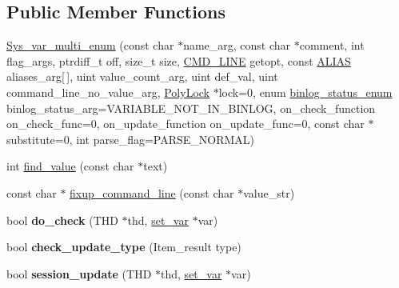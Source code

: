 \subsection*{Public Member Functions}
\begin{DoxyCompactItemize}
\item 
\mbox{\hyperlink{classSys__var__multi__enum_ac0836078707c904cf4bb8b08ab5fe1e8}{Sys\+\_\+var\+\_\+multi\+\_\+enum}} (const char $\ast$name\+\_\+arg, const char $\ast$comment, int flag\+\_\+args, ptrdiff\+\_\+t off, size\+\_\+t size, \mbox{\hyperlink{structCMD__LINE}{C\+M\+D\+\_\+\+L\+I\+NE}} getopt, const \mbox{\hyperlink{structSys__var__multi__enum_1_1ALIAS}{A\+L\+I\+AS}} aliases\+\_\+arg\mbox{[}$\,$\mbox{]}, uint value\+\_\+count\+\_\+arg, uint def\+\_\+val, uint command\+\_\+line\+\_\+no\+\_\+value\+\_\+arg, \mbox{\hyperlink{classPolyLock}{Poly\+Lock}} $\ast$lock=0, enum \mbox{\hyperlink{classsys__var_a664520ec82191888717c86085bfa83ce}{binlog\+\_\+status\+\_\+enum}} binlog\+\_\+status\+\_\+arg=V\+A\+R\+I\+A\+B\+L\+E\+\_\+\+N\+O\+T\+\_\+\+I\+N\+\_\+\+B\+I\+N\+L\+OG, on\+\_\+check\+\_\+function on\+\_\+check\+\_\+func=0, on\+\_\+update\+\_\+function on\+\_\+update\+\_\+func=0, const char $\ast$substitute=0, int parse\+\_\+flag=P\+A\+R\+S\+E\+\_\+\+N\+O\+R\+M\+AL)
\item 
int \mbox{\hyperlink{classSys__var__multi__enum_a96baf73f0d0ef4d45e1961218771809e}{find\+\_\+value}} (const char $\ast$text)
\item 
const char $\ast$ \mbox{\hyperlink{classSys__var__multi__enum_ac0ae51abfc59daf86aeb51b29fc99164}{fixup\+\_\+command\+\_\+line}} (const char $\ast$value\+\_\+str)
\item 
\mbox{\label{classSys__var__multi__enum_a567263dc756ae09a8940ab531d8dbe67}} 
bool {\bfseries do\+\_\+check} (T\+HD $\ast$thd, \mbox{\hyperlink{classset__var}{set\+\_\+var}} $\ast$var)
\item 
\mbox{\label{classSys__var__multi__enum_a4ddae894dcd9c451ce54a8a9d8ef9547}} 
bool {\bfseries check\+\_\+update\+\_\+type} (Item\+\_\+result type)
\item 
\mbox{\label{classSys__var__multi__enum_acbaae3148517ba90b5afc72f84d2e739}} 
bool {\bfseries session\+\_\+update} (T\+HD $\ast$thd, \mbox{\hyperlink{classset__var}{set\+\_\+var}} $\ast$var)
\item 

\end{DoxyCompactItemize}
